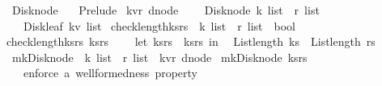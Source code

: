 %
\begin{isabellebody}%
%
%
\isadelimtheory
%
\endisadelimtheory
%
\isatagtheory
{}\isamarkupfalse%
\ Disk{\isacharunderscore}node\ \ \isanewline
{}\ Prelude\isanewline
{}%
\endisatagtheory
{\isafoldtheory}%
%
\isadelimtheory
\isanewline
%
\endisadelimtheory
\isanewline
\isanewline
\isanewline
\isanewline
\isanewline
{}\isamarkupfalse%
\ {\isacharparenleft}{\isacharprime}k{\isacharcomma}{\isacharprime}v{\isacharcomma}{\isacharprime}r{\isacharparenright}\ dnode\ {\isacharequal}\ \isanewline
\ \ Disk{\isacharunderscore}node\ {\isachardoublequoteopen}{\isacharprime}k\ list\ {\isacharasterisk}\ {\isacharprime}r\ list{\isachardoublequoteclose}\ \isanewline
\ \ {\isacharbar}\ Disk{\isacharunderscore}leaf\ {\isachardoublequoteopen}{\isacharparenleft}{\isacharprime}k{\isacharasterisk}{\isacharprime}v{\isacharparenright}\ list{\isachardoublequoteclose}\isanewline
\isanewline
\isanewline
\isanewline
\isanewline
{}\isamarkupfalse%
\ check{\isacharunderscore}length{\isacharunderscore}ks{\isacharunderscore}rs\ {\isacharcolon}{\isacharcolon}\ {\isachardoublequoteopen}{\isacharprime}k\ list\ {\isacharasterisk}\ {\isacharprime}r\ list\ {\isasymRightarrow}\ bool{\isachardoublequoteclose}\ \isanewline
{\isachardoublequoteopen}check{\isacharunderscore}length{\isacharunderscore}ks{\isacharunderscore}rs\ ks{\isacharunderscore}rs\ {\isacharequal}\ {\isacharparenleft}\isanewline
\ \ let\ {\isacharparenleft}ks{\isacharcomma}rs{\isacharparenright}\ {\isacharequal}\ ks{\isacharunderscore}rs\ in\isanewline
\ \ {}{\isacharplus}List{\isachardot}length\ ks\ {\isacharequal}\ List{\isachardot}length\ rs{\isacharparenright}{\isachardoublequoteclose}\isanewline
\ \ \isanewline
\isanewline
{}\isamarkupfalse%
\ mk{\isacharunderscore}Disk{\isacharunderscore}node\ {\isacharcolon}{\isacharcolon}\ {\isachardoublequoteopen}{\isacharprime}k\ list\ {\isacharasterisk}\ {\isacharprime}r\ list\ {\isasymRightarrow}\ {\isacharparenleft}{\isacharprime}k{\isacharcomma}{\isacharprime}v{\isacharprime}{\isacharcomma}{\isacharprime}r{\isacharparenright}\ dnode{\isachardoublequoteclose}\ \isanewline
{\isachardoublequoteopen}mk{\isacharunderscore}Disk{\isacharunderscore}node\ ks{\isacharunderscore}rs\ {\isacharequal}\ {\isacharparenleft}\isanewline
\ \ {\isacharparenleft}{\isacharasterisk}\ enforce\ a\ wellformedness\ property\ {\isacharasterisk}{\isacharparenright}\isanewline

\end{isabellebody}
